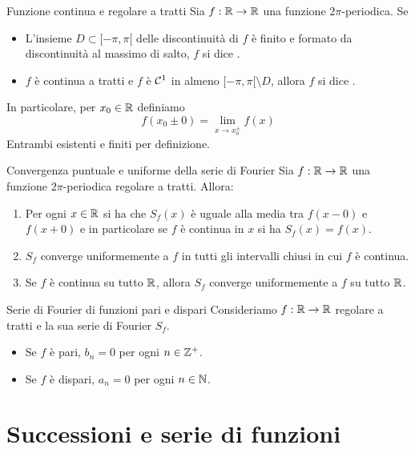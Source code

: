 \documentclass{article}
\begin{document}
\begin{definition}{Funzione continua e regolare a tratti}{}
    Sia $f:\mathbb{R} \to \mathbb{R}$ una funzione $2\pi$-periodica. Se \begin{itemize}
        \item L'insieme $D \subset [-\pi,\pi[$ delle discontinuità di $f$ è finito e formato da discontinuità al massimo di salto, $f$ si dice .
        \item $f$ è continua a tratti e $f$ è $\mathcal{C}^1$ in almeno $[-\pi,\pi[\setminus D$, allora $f$ si dice .
    \end{itemize}
    In particolare, per $x_0 \in \mathbb{R}$ definiamo
    \[f(x_0\pm 0) = \lim_{x \to x_0^\pm} f(x)\]
    Entrambi esistenti e finiti per definizione.
\end{definition}

\begin{theorem}{Convergenza puntuale e uniforme della serie di Fourier}{}
    Sia $f:\mathbb{R}\to\mathbb{R}$ una funzione $2\pi$-periodica regolare a tratti. Allora:\begin{enumerate}
        \item Per ogni $x \in \mathbb{R}$ si ha che $S_f(x)$ è uguale alla media tra $f(x-0)$ e $f(x+0)$ e in particolare se $f$ è continua in $x$ si ha $S_f(x) = f(x)$.
        \item $S_f$ converge uniformemente a $f$ in tutti gli intervalli chiusi in cui $f$ è continua.
        \item Se $f$ è continua su tutto $\mathbb{R}$, allora $S_f$ converge uniformemente a $f$ su tutto $\mathbb{R}$.
    \end{enumerate}
\end{theorem}

\begin{remark}{Serie di Fourier di funzioni pari e dispari}{}
    Consideriamo $f:\mathbb{R}\to\mathbb{R}$ regolare a tratti e la sua serie di Fourier $S_f$.\begin{itemize}
        \item Se $f$ è pari, $b_n = 0$ per ogni $n \in \mathbb{Z}^+$.
        \item Se $f$ è dispari, $a_n = 0$ per ogni $n \in \mathbb{N}$.
    \end{itemize}
\end{remark}

\section{Successioni e serie di funzioni}
\end{document}

